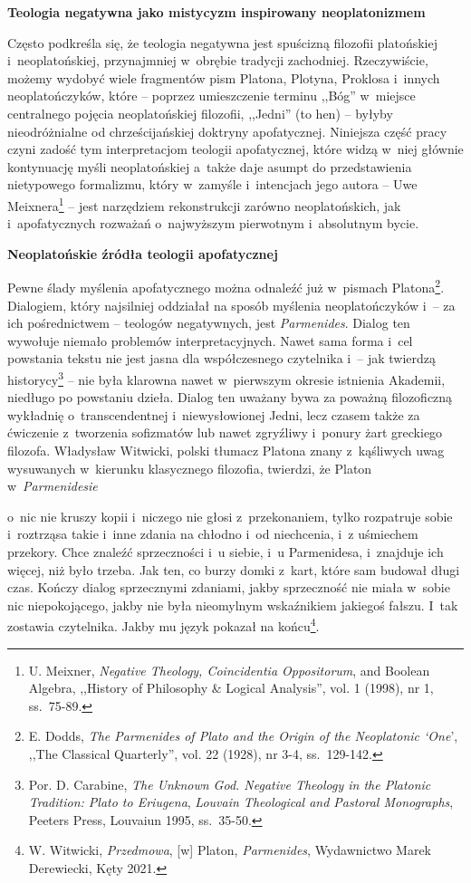 

\textbf{Teologia negatywna jako mistycyzm inspirowany neoplatonizmem}

Często podkreśla się, że teologia negatywna jest spuścizną filozofii platońskiej i~neoplatońskiej, przynajmniej w~obrębie tradycji zachodniej. Rzeczywiście, możemy wydobyć wiele fragmentów pism Platona, Plotyna, Proklosa i~innych neoplatończyków, które -- poprzez umieszczenie terminu ,,Bóg'' w~miejsce centralnego pojęcia neoplatońskiej filozofii, ,,Jedni'' (to hen) -- byłyby nieodróżnialne od chrześcijańskiej doktryny apofatycznej. Niniejsza część pracy czyni zadość tym interpretacjom teologii apofatycznej, które widzą w~niej głównie kontynuację myśli neoplatońskiej a~także daje asumpt do przedstawienia nietypowego formalizmu, który w~zamyśle i~intencjach jego autora -- Uwe Meixnera\footnote{ U. Meixner, \textit{Negative Theology, Coincidentia Oppositorum}, and Boolean Algebra, ,,History of Philosophy \& Logical Analysis'', vol. 1 (1998), nr 1, ss.~75-89.} -- jest narzędziem rekonstrukcji zarówno neoplatońskich, jak i~apofatycznych rozważań o~najwyższym pierwotnym i~absolutnym bycie.

\textbf{Neoplatońskie źródła teologii apofatycznej}

Pewne ślady myślenia apofatycznego można odnaleźć już w~pismach Platona\footnote{ E. Dodds, \textit{The Parmenides of Plato and the Origin of the Neoplatonic ‘One}', ,,The Classical Quarterly'', vol. 22 (1928), nr 3-4, ss.~129-142.}. Dialogiem, który najsilniej oddziałał na sposób myślenia neoplatończyków i~-- za ich pośrednictwem -- teologów negatywnych, jest \textit{Parmenides}. Dialog ten wywołuje niemało problemów interpretacyjnych. Nawet sama forma i~cel powstania tekstu nie jest jasna dla współczesnego czytelnika i~-- jak twierdzą historycy\footnote{ Por. D. Carabine, \textit{The Unknown God. Negative Theology in the Platonic Tradition: Plato to Eriugena}, \textit{Louvain Theological and Pastoral Monographs}, Peeters Press, Louvaiun 1995, ss.~35-50.} -- nie była klarowna nawet w~pierwszym okresie istnienia Akademii, niedługo po powstaniu dzieła. Dialog ten uważany bywa za poważną filozoficzną wykładnię o~transcendentnej i~niewysłowionej Jedni, lecz czasem także za ćwiczenie z~tworzenia sofizmatów lub nawet zgryźliwy i~ponury żart greckiego filozofa. Władysław Witwicki, polski tłumacz Platona znany z~kąśliwych uwag wysuwanych w~kierunku klasycznego filozofia, twierdzi, że Platon w~\textit{Parmenidesie}

o~nic nie kruszy kopii i~niczego nie głosi z~przekonaniem, tylko rozpatruje sobie i~roztrząsa takie i~inne zdania na chłodno i~od niechcenia, i~z uśmiechem przekory. Chce znaleźć sprzeczności i~u siebie, i~u Parmenidesa, i~znajduje ich więcej, niż było trzeba. Jak ten, co burzy domki z~kart, które sam budował długi czas. Kończy dialog sprzecznymi zdaniami, jakby sprzeczność nie miała w~sobie nic niepokojącego, jakby nie była nieomylnym wskaźnikiem jakiegoś fałszu. I~tak zostawia czytelnika. Jakby mu język pokazał na końcu\footnote{ W. Witwicki, \textit{Przedmowa}, [w] Platon, \textit{Parmenides}, Wydawnictwo Marek Derewiecki, Kęty 2021.}.

